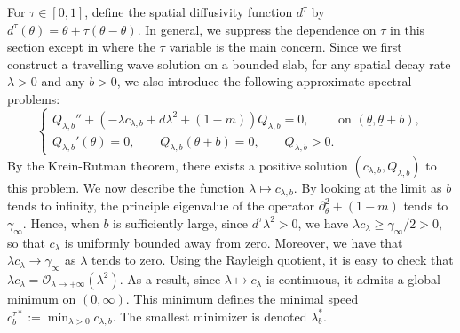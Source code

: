 \documentclass[11pt]{article}    %
\newcommand{\EB}[1]{\textcolor{blue}{#1}}
\begin{document}
For $\tau \in [0,1]$, define the spatial diffusivity function $d^\tau$ by $d^\tau(\theta) = \underline \theta  + \tau \left( \theta - \underline \theta \right).$
In general, we suppress the dependence on $\tau$ in this section except in  where the $\tau$ variable is the main concern.  Since we first construct a travelling wave solution on a bounded slab, for any spatial decay rate $\lambda > 0$ and any $b>0$, we also introduce the following approximate spectral problems:
\begin{equation}\label{eq:spectral_problem}
\begin{cases}
 Q_{\lambda,b} ''+ \left( - \lambda c_{\lambda,b} + d \lambda^2   + \left( 1 - m \right) \right) Q_{\lambda,b} = 0, \qquad \text{ on } (\underline\theta, \underline\theta + b),\\
Q_{\lambda,b}' \left( \underline\theta \right) = 0,\qquad 
Q_{\lambda,b}  \left( \underline\theta + b\right) = 0, \qquad
Q_{\lambda,b} > 0.
\end{cases}
\end{equation}
%
By the Krein-Rutman theorem, there exists a positive solution $(c_{\lambda,b}, Q_{\lambda,b})$ to this problem. 
%
We now describe the function $\lambda \mapsto c_{\lambda,b}$.  By looking at the limit as $b$ tends to infinity, the principle eigenvalue of the operator $\partial_\theta^2 + (1-m)$ tends to $\gamma_\infty$.  Hence, when $b$ is sufficiently large, since $d^\tau \lambda^2 > 0$, we have $\lambda c_\lambda \geq \gamma_\infty/2 > 0$, so that $c_\lambda$ is uniformly bounded away from zero. Moreover, we  have that $\lambda c_\lambda \to \gamma_\infty$ as $\lambda$ tends to zero.  Using the Rayleigh quotient, it is easy to check that $\lambda c_\lambda = \mathcal{O}_{\lambda \to + \infty}\left(\lambda^2\right)$.  As a result, since $\lambda \mapsto c_\lambda$ is continuous, it admits a global minimum on $(0,\infty)$.  This minimum defines the minimal speed $c_{b}^{\tau*} := \min_{\lambda > 0} c_{\lambda,b}$. The smallest minimizer is denoted $\lambda_b^*$.
\end{document}
